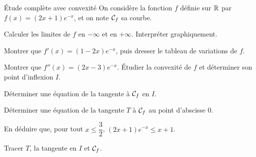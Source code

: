 \begin{exercice}[3]{Étude complète avec convexité}
On considère la fonction $f$ définie sur $\mathbb{R}$ par $f(x)=(2x+1)e^{-x}$, et on note $\mathcal{C}_f$ sa courbe.
\begin{questions}
  \item Calculer les limites de $f$ en $-\infty$ et en $+\infty$. Interpréter graphiquement.
  \item Montrer que $f'(x)=(1-2x)e^{-x}$, puis dresser le tableau de variations de $f$.
\end{questions}
\begin{questions}[resume]
  \item Montrer que $f''(x)=(2x-3)e^{-x}$. Étudier la convexité de $f$ et déterminer son point d'inflexion $I$.
  \item Déterminer une équation de la tangente à $\mathcal{C}_f$ en $I$.
  \item Déterminer une équation de la tangente $T$ à $\mathcal{C}_f$ au point d'abscisse $0$.
  \item En déduire que, pour tout $x\leq\dfrac32$, $(2x+1)e^{-x}\leq x+1$.
  \item Tracer $T$, la tangente en $I$ et $\mathcal{C}_f$.
\end{questions}
\end{exercice}

